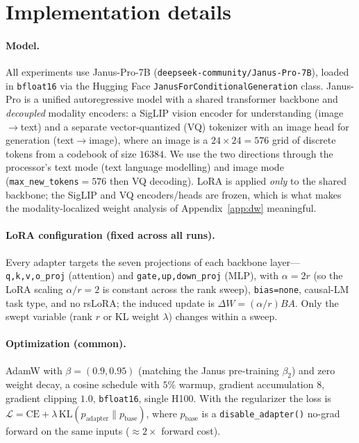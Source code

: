 \appendix

\section{Implementation details}
\label{app:impl}

\paragraph{Model.}
All experiments use Janus-Pro-7B (\texttt{deepseek-community/Janus-Pro-7B}),
loaded in \texttt{bfloat16} via the Hugging Face
\texttt{JanusForConditionalGeneration} class. Janus-Pro is a unified
autoregressive model with a shared transformer backbone and \emph{decoupled}
modality encoders: a SigLIP vision encoder for understanding (image$\to$text) and
a separate vector-quantized (VQ) tokenizer with an image head for generation
(text$\to$image), where an image is a $24\times24=576$ grid of discrete tokens
from a codebook of size $16384$. We use the two directions through the
processor's text mode (text language modelling) and image mode
(\texttt{max\_new\_tokens}$=576$ then VQ decoding). LoRA is applied \emph{only} to
the shared backbone; the SigLIP and VQ encoders/heads are frozen, which is what
makes the modality-localized weight analysis of Appendix~\ref{app:dw}
meaningful.

\paragraph{LoRA configuration (fixed across all runs).}
Every adapter targets the seven projections of each backbone layer---%
\texttt{q,k,v,o\_proj} (attention) and \texttt{gate,up,down\_proj} (MLP), with
$\alpha=2r$ (so the LoRA scaling $\alpha/r=2$ is constant across the rank sweep),
\texttt{bias=none}, causal-LM task type, and no rsLoRA; the induced update is
$\Delta W=(\alpha/r)BA$. Only the swept variable (rank $r$ or KL weight $\lambda$)
changes within a sweep.

\paragraph{Optimization (common).}
AdamW with $\beta=(0.9,0.95)$ (matching the Janus pre-training $\beta_2$) and zero
weight decay, a cosine schedule with $5\%$ warmup, gradient accumulation $8$,
gradient clipping $1.0$, \texttt{bfloat16}, single H100. With the regularizer the
loss is
$\mathcal{L}=\mathrm{CE}+\lambda\,\mathrm{KL}(p_{\text{adapter}}\|p_{\text{base}})$,
where $p_{\text{base}}$ is a \texttt{disable\_adapter()} no-grad forward on the
same inputs ($\approx$$2\times$ forward cost).

